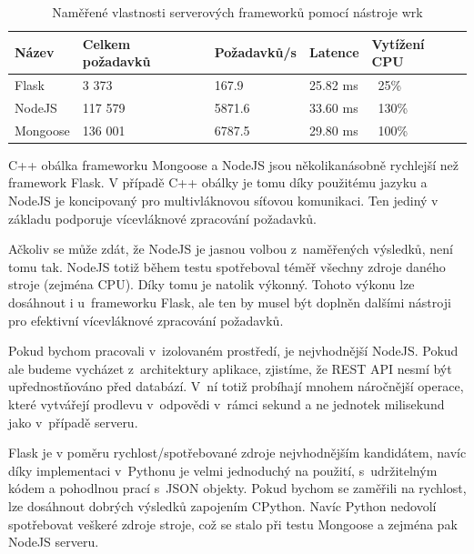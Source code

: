 \begin{table}[ht]
\centering
\caption{Naměřené vlastnosti serverových frameworků pomocí nástroje wrk}
\label{tab:server}
\begin{tabular}{|l|l|l|l|l|}
\hline
    Název       & Celkem požadavků  & Požadavků/s   & Latence   & Vytížení CPU\\ \hline
    Flask       & 3 373             & 167.9         & 25.82 ms  & ~25\%\\
    NodeJS      & 117 579           & 5871.6        & 33.60 ms  & ~130\%\\
    Mongoose    & 136 001           & 6787.5        & 29.80 ms  & ~100\%\\
   \hline
\end{tabular}
\end{table}


C++ obálka frameworku Mongoose a NodeJS jsou několikanásobně rychlejší než framework Flask. V případě C++ obálky je tomu díky použitému jazyku a NodeJS je koncipovaný pro multivláknovou síťovou komunikaci. Ten jediný v základu podporuje vícevláknové zpracování požadavků. 

Ačkoliv se může zdát, že NodeJS je jasnou volbou z~naměřených výsledků, není tomu tak. NodeJS totiž během testu spotřeboval téměř všechny zdroje daného stroje (zejména CPU). Díky tomu je natolik výkonný. Tohoto výkonu lze dosáhnout i u~frameworku Flask, ale ten by musel být doplněn dalšími nástroji pro efektivní vícevláknové zpracování požadavků.

Pokud bychom pracovali v~izolovaném prostředí, je nejvhodnější NodeJS. Pokud ale budeme vycházet z~architektury aplikace, zjistíme, že REST API nesmí být upřednostňováno před databází. V~ní totiž probíhají mnohem náročnější operace, které vytvářejí prodlevu v~odpovědi v~rámci sekund a ne jednotek milisekund jako v~případě serveru. 

Flask je v poměru rychlost/spotřebované zdroje nejvhodnějším kandidátem, navíc díky implementaci v~Pythonu je velmi jednoduchý na použití, s~udržitelným kódem a pohodlnou prací s~JSON objekty. Pokud bychom se zaměřili na rychlost, lze dosáhnout dobrých výsledků zapojením CPython. Navíc Python nedovolí spotřebovat veškeré zdroje stroje, což se stalo při testu Mongoose a zejména pak NodeJS serveru.


